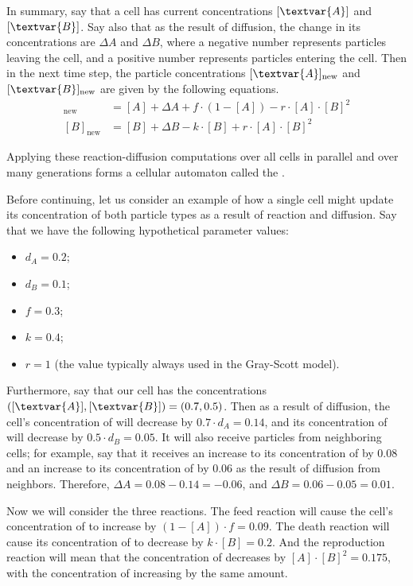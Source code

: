 In summary, say that a cell has current concentrations $[\textvar{A}]$ and $[\textvar{B}]$. Say also that as the result of diffusion, the change in its concentrations are $\Delta A$ and $\Delta B$, where a negative number represents particles leaving the cell, and a positive number represents particles entering the cell. Then in the next time step, the particle concentrations $[\textvar{A}]_{\text{new}}$ and $[\textvar{B}]_{\text{new}}$ are given by the following equations.
\begin{align*}
[A]_{\text{new}} & = [A] + \Delta A + f \cdot (1-[A]) - r \cdot [A] \cdot [B]^2\\
[B]_{\text{new}} & = [B] + \Delta B - k \cdot [B] + r \cdot [A] \cdot [B]^2
\end{align*}

Applying these reaction-diffusion computations over all cells in parallel and over many generations forms a cellular automaton called the .

Before continuing, let us consider an example of how a single cell might update its concentration of both particle types as a result of reaction and diffusion.  Say that we have the following hypothetical parameter values:

\begin{itemize}
\item $d_A = 0.2$;
\item $d_B = 0.1$;
\item $f = 0.3$;
\item $k = 0.4$;
\item $r = 1$ (the value typically always used in the Gray-Scott model).
\end{itemize}

Furthermore, say that our cell has the concentrations $([\textvar{A}], [\textvar{B}]) = (0.7, 0.5)$. Then as a result of diffusion, the cell's concentration of  will decrease by $0.7 \cdot d_A = 0.14$, and its concentration of  will decrease by $0.5 \cdot d_B = 0.05$. It will also receive particles from neighboring cells; for example, say that it receives an increase to its concentration of  by 0.08 and an increase to its concentration of  by 0.06 as the result of diffusion from neighbors. Therefore, $\Delta A  = 0.08 - 0.14 = -0.06$, and $\Delta B = 0.06 - 0.05 = 0.01$.

Now we will consider the three reactions. The feed reaction will cause the cell's concentration of  to increase by $(1 - [A]) \cdot f = 0.09$. The death reaction will cause its concentration of  to decrease by $k \cdot [B] = 0.2$. And the reproduction reaction will mean that the concentration of  decreases by $[A] \cdot [B]^2 = 0.175$, with the concentration of  increasing by the same amount.

